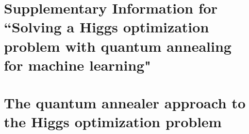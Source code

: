 \section{Supplementary Information for ``Solving a Higgs optimization problem with quantum annealing for machine learning"}





\section{The quantum annealer approach to the Higgs optimization problem}

